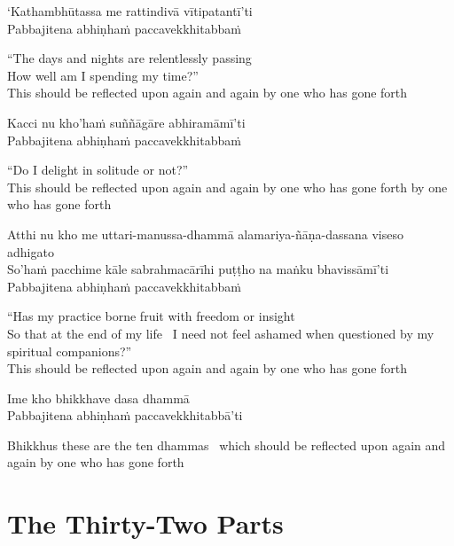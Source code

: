 `Kathambhūtassa me rattindivā vītipatantī'ti\\
Pabbajitena abhiṇhaṁ paccavekkhitabbaṁ

\begin{english}
  “The days and nights are relentlessly passing\\
  How well am I spending my time?”\\
  This should be reflected upon again and again by one who has gone forth
\end{english}

Kacci nu kho'haṁ suññāgāre abhiramāmī'ti\\
Pabbajitena abhiṇhaṁ paccavekkhitabbaṁ

\begin{english}
  “Do I delight in solitude or not?”\\
  This should be reflected upon again and again by one who has gone forth by one who has gone forth
\end{english}

Atthi nu kho me uttari-manussa-dhammā alamariya-ñāṇa-dassana viseso adhigato\\
So’haṁ pacchime kāle sabrahmacārīhi puṭṭho na maṅku bhavissāmī’ti\\
Pabbajitena abhiṇhaṁ paccavekkhitabbaṁ

\begin{english}
  “Has my practice borne fruit with freedom or insight\\
  So that at the end of my life \breathmark\ I need not feel ashamed when questioned by my spiritual companions?”\\
  This should be reflected upon again and again by one who has gone forth
\end{english}

Ime kho bhikkhave dasa dhammā\\
Pabbajitena abhiṇhaṁ paccavekkhitabbā'ti

\begin{english}
  Bhikkhus these are the ten dhammas \breathmark\ which should be reflected upon again and again by one who has gone forth
\end{english}

\suttaRef{[AN 10.48]}


\section{The Thirty-Two Parts}
\label{32-parts}

